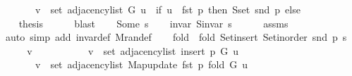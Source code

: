 \begin{isabellebody}
\ \ \ \ \ \ \ v\ {\isasymin}\ set\ {\isacharparenleft}{\kern0pt}adjacency{\isacharunderscore}{\kern0pt}list\ G\ u{\isacharparenright}{\kern0pt}\ {\isasymunion}\ {\isacharparenleft}{\kern0pt}if\ u\ {\isacharequal}{\kern0pt}\ fst\ p\ then\ S{\isachardot}{\kern0pt}set\ {\isacharparenleft}{\kern0pt}snd\ p{\isacharparenright}{\kern0pt}\ else\ {\isacharbraceleft}{\kern0pt}{\isacharbraceright}{\kern0pt}{\isacharparenright}{\kern0pt}{\isachardoublequoteclose}\isanewline
\ \ \ \ \ \ \isacommand{{\isachardot}{\kern0pt}}\isamarkupfalse%
\ \isacommand{{\isacharbraceright}{\kern0pt}}\isamarkupfalse%
\isanewline
\ \ \isamarkupfalse%
\ {\isacharquery}{\kern0pt}thesis\isanewline
\ \ \ \ \isamarkupfalse%
\ blast\isanewline
{}\isamarkupfalse%
\isanewline
\ \ \isamarkupfalse%
\ {\isacharparenleft}{\kern0pt}Some\ s{\isacharprime}{\kern0pt}{\isacharparenright}{\kern0pt}\isanewline
\ \ \isamarkupfalse%
\ invar{\isacharcolon}{\kern0pt}\ {\isachardoublequoteopen}S{\isachardot}{\kern0pt}invar\ s{\isacharprime}{\kern0pt}{\isachardoublequoteclose}\isanewline
\ \ \ \ \isamarkupfalse%
\ assms{\isacharparenleft}{\kern0pt}{}{\isacharparenright}{\kern0pt}\isanewline
\ \ \ \ \isamarkupfalse%
\ {\isacharparenleft}{\kern0pt}auto\ simp\ add{\isacharcolon}{\kern0pt}\ invar{\isacharunderscore}{\kern0pt}def\ M{\isachardot}{\kern0pt}ran{\isacharunderscore}{\kern0pt}def{\isacharparenright}{\kern0pt}\isanewline
\ \ \isamarkupfalse%
\ {\isacharquery}{\kern0pt}fold\ {\isacharequal}{\kern0pt}\ {\isachardoublequoteopen}fold\ Set{\isacharunderscore}{\kern0pt}insert\ {\isacharparenleft}{\kern0pt}Set{\isacharunderscore}{\kern0pt}inorder\ {\isacharparenleft}{\kern0pt}snd\ p{\isacharparenright}{\kern0pt}{\isacharparenright}{\kern0pt}\ s{\isacharprime}{\kern0pt}{\isachardoublequoteclose}\isanewline
\ \ \isacommand{{\isacharbraceleft}{\kern0pt}}\isamarkupfalse%
\ \isamarkupfalse%
\ v\isanewline
\ \ \ \ \isamarkupfalse%
\isanewline
\ \ \ \ \ \ {\isachardoublequoteopen}v\ {\isasymin}\ set\ {\isacharparenleft}{\kern0pt}adjacency{\isacharunderscore}{\kern0pt}list\ {\isacharparenleft}{\kern0pt}insert{\isacharunderscore}{\kern0pt}{}\ p\ G{\isacharparenright}{\kern0pt}\ u{\isacharparenright}{\kern0pt}\ {\isasymlongleftrightarrow}\isanewline
\ \ \ \ \ \ \ v\ {\isasymin}\ set\ {\isacharparenleft}{\kern0pt}adjacency{\isacharunderscore}{\kern0pt}list\ {\isacharparenleft}{\kern0pt}Map{\isacharunderscore}{\kern0pt}update\ {\isacharparenleft}{\kern0pt}fst\ p{\isacharparenright}{\kern0pt}\ {\isacharquery}{\kern0pt}fold\ G{\isacharparenright}{\kern0pt}\ u{\isacharparenright}{\kern0pt}{\isachardoublequoteclose}\isanewline

\end{isabellebody}
